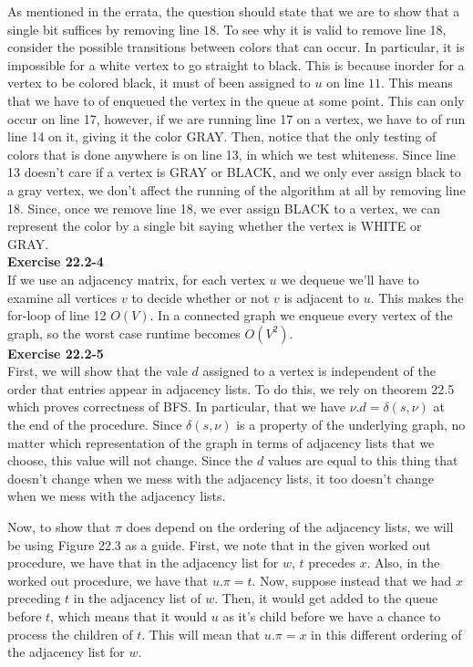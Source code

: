 \documentclass{article}
\begin{document}
As mentioned in the errata, the question should state that we are to show that a single bit suffices by removing line $18$. To see why it is valid to remove line 18, consider the possible transitions between colors that can occur. In particular, it is impossible for a white vertex to go straight to black. This is because inorder for a vertex to be colored black, it must of been assigned to $u$ on line $11$. This means that we have to of enqueued the vertex in the queue at some point. This can only occur on line 17, however, if we are running line 17 on a vertex, we have to of run line 14 on it, giving it the color GRAY. Then, notice that the only testing of colors that is done anywhere is on line 13, in which we test whiteness. Since line 13 doesn't care if a vertex is GRAY or BLACK, and we only ever assign black to a gray vertex, we don't affect the running of the algorithm at all by removing line 18. Since, once we remove line 18, we ever assign BLACK to a vertex, we can represent the color by a single bit saying whether the vertex is WHITE or GRAY.\\

\noindent\textbf{Exercise 22.2-4}\\

If we use an adjacency matrix, for each vertex $u$ we dequeue we'll have to examine all vertices $v$ to decide whether or not $v$ is adjacent to $u$.  This makes the for-loop of line 12 $O(V)$.  In a connected graph we enqueue every vertex of the graph, so the worst case runtime becomes $O(V^2)$. \\

\noindent\textbf{Exercise 22.2-5}\\

First, we will show that the vale $d$ assigned to a vertex is independent of the order that entries appear in adjacency lists. To do this, we rely on theorem 22.5 which proves correctness of BFS. In particular, that we have $\nu.d = \delta(s,\nu)$ at the end of the procedure. Since $\delta(s,\nu)$ is a property of the underlying graph, no matter which representation of the graph in terms of adjacency lists that we choose, this value will not change. Since the $d$ values are equal to this thing that doesn't change when we mess with the adjacency lists, it too doesn't change when we mess with the adjacency lists.

Now, to show that $\pi$ does depend on the ordering of the adjacency lists, we will be using Figure 22.3 as a guide. First, we note that in the given worked out procedure, we have that in the adjacency list for $w$, $t$ precedes $x$. Also, in the worked out procedure, we have that $u.\pi = t$. Now, suppose instead that we had $x$ preceding $t$ in the adjacency list of $w$. Then, it would get added to the queue before $t$, which means that it would $u$ as it's child before we have a chance to process the children of $t$. This will mean that $u.\pi = x$ in this different ordering of the adjacency list for $w$.\\
\end{document}

